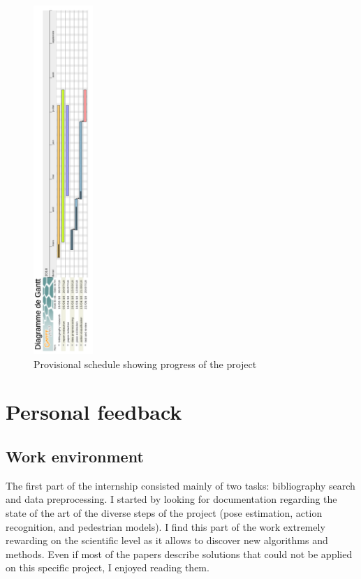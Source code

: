 \documentclass[12pt,a4paper,twoside]{article}
\begin{document}
\begin{figure}
    \centering
        \includegraphics[width=0.2\textwidth]{images/gantt}
    \caption{Provisional schedule showing progress of the project}
\label{fig:gantt}
\end{figure}

\newpage

\section{Personal feedback}

\subsection{Work environment}
The first part of the internship consisted mainly of two tasks: bibliography search and data preprocessing. I started by looking for documentation regarding the state of the art of the diverse steps of the project (pose estimation, action recognition, and pedestrian models). I find this part of the work extremely rewarding on the scientific level as it allows to discover new algorithms and methods. Even if most of the papers describe solutions that could not be applied on this specific project, I enjoyed reading them.
\end{document}
